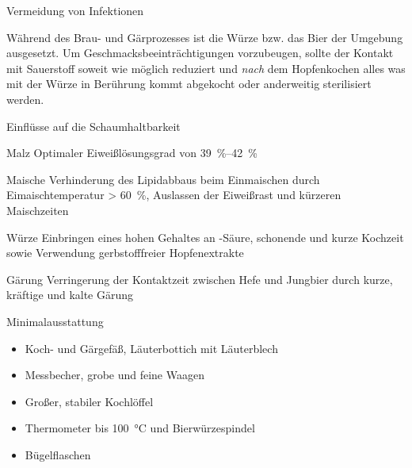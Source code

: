 \documentclass[9pt, ngerman]{beamer}
\begin{document}
\begin{frame}{Vermeidung von Infektionen}

  Während des Brau- und Gärprozesses ist die Würze bzw. das Bier der Umgebung
  ausgesetzt. Um Geschmacksbeeinträchtigungen vorzubeugen, sollte der Kontakt
  mit Sauerstoff soweit wie möglich reduziert und \emph{nach} dem Hopfenkochen
  alles was mit der Würze in Berührung kommt abgekocht oder anderweitig
  sterilisiert werden.

\end{frame}
\begin{frame}{Einflüsse auf die Schaumhaltbarkeit}
  \begin{block}{Malz}
    \vspace{0.5em}
    Optimaler Eiweißlösungsgrad von \SIrange{39}{42}{\percent}
  \end{block}
  \begin{block}{Maische}
    \vspace{0.5em}
    Verhinderung des Lipidabbaus beim Einmaischen durch Eimaischtemperatur >
    \SI{60}{\percent}, Auslassen der Eiweißrast und kürzeren Maischzeiten
  \end{block}
  \begin{block}{Würze}
    \vspace{0.5em}
    Einbringen eines hohen Gehaltes an \textalpha-Säure, schonende und kurze
    Kochzeit sowie Verwendung gerbstofffreier Hopfenextrakte
  \end{block}
  \begin{block}{Gärung}
    \vspace{0.5em}
    Verringerung der Kontaktzeit zwischen Hefe und Jungbier durch kurze,
    kräftige und kalte Gärung
  \end{block}
\end{frame}
\begin{frame}{Minimalausstattung}
  \begin{itemize}
    \item Koch- und Gärgefäß, Läuterbottich mit Läuterblech
    \item Messbecher, grobe und feine Waagen
    \item Großer, stabiler Kochlöffel
    \item Thermometer bis \SI{100}{\celsius} und Bierwürzespindel
    \item Bügelflaschen
  \end{itemize}
\end{frame}
\end{document}
